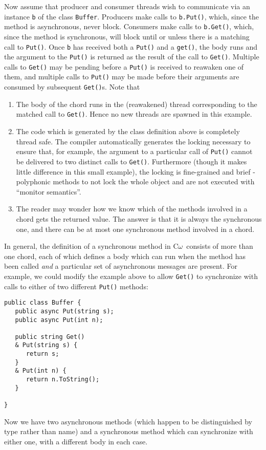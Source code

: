 \documentclass{article}
\newcommand{\comega}{\mbox{C$\omega$}}
\begin{document}
Now assume that producer and consumer threads wish to communicate via
an instance \verb|b| of the class \verb|Buffer|. Producers make calls
to \verb|b.Put()|, which, since the method is asynchronous, never
block. Consumers make calls to \verb|b.Get()|, which, since the method
is synchronous, will block until or unless there is a matching call to
\verb|Put()|. Once \verb|b| has received both a \verb|Put()| and a
\verb|get()|, the body runs and the argument to the \verb|Put()| is
returned as the result of the call to \verb|Get()|. Multiple calls to
\verb|Get()| may be pending before a \verb|Put()| is received to
reawaken one of them, and multiple calls to \verb|Put()| may be made
before their arguments are consumed by subsequent \verb|Get()|s. Note
that
\begin{enumerate}
\item The body of the chord runs in the (reawakened) thread
corresponding to the matched call to \verb|Get()|. Hence no new threads are
spawned in this example.
\item The code which is generated by the class definition above is
completely thread safe. The compiler automatically generates the
locking necessary to ensure that, for example, the argument to a
particular call of \verb|Put()| cannot be delivered to two distinct calls to
\verb|Get()|. Furthermore (though it makes little difference in this small
example), the locking is fine-grained and brief - polyphonic methods
to not lock the whole object and are not executed with ``monitor
semantics''.
\item The reader may wonder how we know which of the methods involved
in a chord gets the returned value. The answer is that it is always
the synchronous one, and there can be at most one synchronous method
involved in a chord.
\end{enumerate}

In general, the definition of a synchronous method in \comega\
consists of more than one chord, each of which defines a body which
can run when the method has been called \emph{and} a particular set of
asynchronous messages are present. For example, we could modify the
example above to allow \verb|Get()| to synchronize with calls to
either of two different \verb|Put()| methods:
\begin{verbatim}
public class Buffer {
   public async Put(string s);
   public async Put(int n);
   
   public string Get() 
   & Put(string s) { 
      return s; 
   } 
   & Put(int n) {
      return n.ToString();
   }
   
} 
\end{verbatim}
Now we have two asynchronous methods (which happen to be
distinguished by type rather than name) and a synchronous method which
can synchronize with either one, with a different body in each case.
\end{document}
